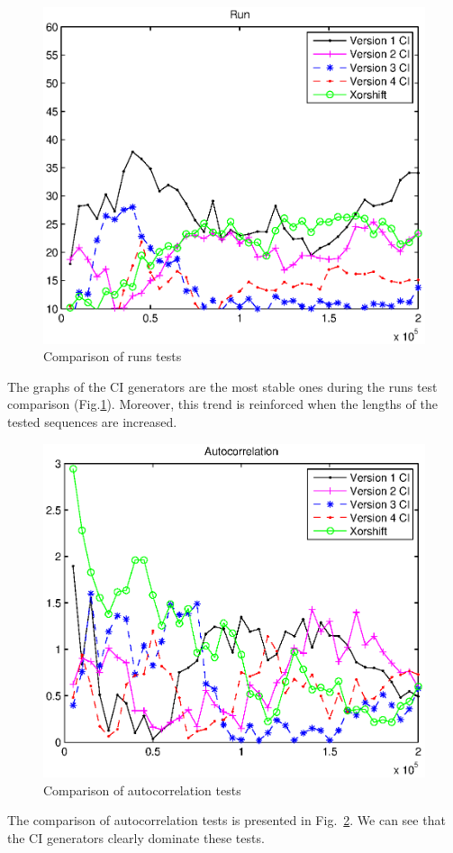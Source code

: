 \begin{figure}
\centering
\includegraphics[scale=0.8]{runs.eps}
\caption{Comparison of runs tests}
\label{runs}
\end{figure}

The graphs of the CI generators are the most stable ones during the runs test comparison (Fig.\ref{runs}). Moreover, this trend is reinforced when the lengths of the tested sequences are increased.
%
%
\begin{figure}
\centering
\includegraphics[scale=0.8]{autocorrelation1.eps}
\caption{Comparison of autocorrelation tests}
\label{autocorrelation}
\end{figure}
%
%
The comparison of autocorrelation tests is presented in Fig.~\ref{autocorrelation}. We can see that the CI generators clearly dominate these tests.

